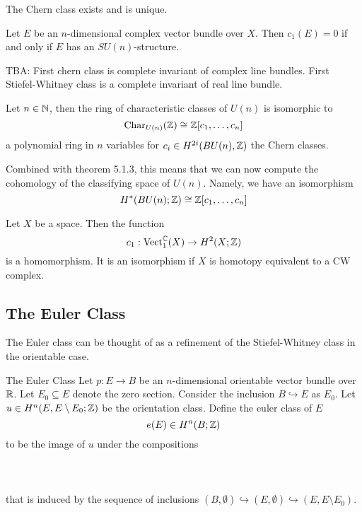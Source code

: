 \documentclass[a4paper]{article}
\begin{document}
\begin{thm}{}{} The Chern class exists and is unique. 
\end{thm}

\begin{thm}{}{} Let $E$ be an $n$-dimensional complex vector bundle over $X$. Then $c_1(E)=0$ if and only if $E$ has an $SU(n)$-structure. 
\end{thm}

TBA: First chern class is complete invariant of complex line bundles. First Stiefel-Whitney class is a complete invariant of real line bundle. 

\begin{thm}{}{} Let $n\in\mathbb{N}$, then the ring of characteristic classes of $U(n)$ is isomorphic to $$\text{Char}_{U(n)}(\mathbb{Z})\cong\mathbb{Z}[c_1,\dots,c_n]$$ a polynomial ring in $n$ variables for $c_i\in H^{2i}(BU(n),\mathbb{Z})$ the Chern classes. 
\end{thm}

Combined with theorem 5.1.3, this means that we can now compute the cohomology of the  classifying space of $U(n)$. Namely, we have an isomorphism $$H^\ast(BU(n);\mathbb{Z})\cong\mathbb{Z}[c_1,\dots,c_n]$$

\begin{prp}{}{} Let $X$ be a space. Then the function $$c_1:\text{Vect}_1^{\mathbb{C}}(X)\to H^2(X;\mathbb{Z})$$ is a homomorphism. It is an isomorphism if $X$ is homotopy equivalent to a CW complex. 
\end{prp}

\subsection{The Euler Class}
The Euler class can be thought of as a refinement of the Stiefel-Whitney class in the orientable case. 

\begin{defn}{The Euler Class}{} Let $p:E\to B$ be an $n$-dimensional orientable vector bundle over $\mathbb{R}$. Let $E_0\subseteq E$ denote the zero section. Consider the inclusion $B\hookrightarrow E$ as $E_0$. Let $u\in H^n(E,E\setminus E_0;\mathbb{Z})$ be the orientation class. Define the euler class of $E$ $$e(E)\in H^n(B;\mathbb{Z})$$ to be the image of $u$ under the compositions \\~\\
\\~\\
that is induced by the sequence of inclusions $(B,\emptyset)\hookrightarrow(E,\emptyset)\hookrightarrow(E,E\setminus E_0)$.
\end{defn}
\end{document}
